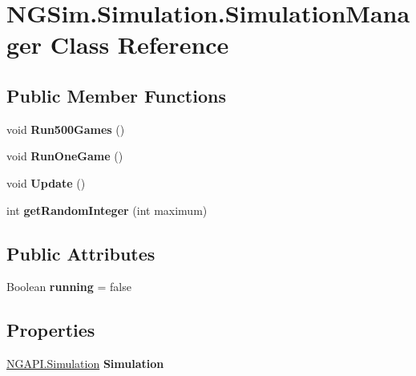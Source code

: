 \hypertarget{class_n_g_sim_1_1_simulation_1_1_simulation_manager}{}\section{N\+G\+Sim.\+Simulation.\+Simulation\+Manager Class Reference}
\label{class_n_g_sim_1_1_simulation_1_1_simulation_manager}
\subsection*{Public Member Functions}
\begin{DoxyCompactItemize}
\item 
\mbox{\label{class_n_g_sim_1_1_simulation_1_1_simulation_manager_afbd05d5e2c71d6c78a1a05cd77a2b246}} 
void {\bfseries Run500\+Games} ()
\item 
\mbox{\label{class_n_g_sim_1_1_simulation_1_1_simulation_manager_af5365991d5e5c33560a7059349e9df00}} 
void {\bfseries Run\+One\+Game} ()
\item 
\mbox{\label{class_n_g_sim_1_1_simulation_1_1_simulation_manager_a0d06f65c2f9db77f976fd15d2b10c96c}} 
void {\bfseries Update} ()
\item 
\mbox{\label{class_n_g_sim_1_1_simulation_1_1_simulation_manager_a3776b01cabeadc19c432985a422eca26}} 
int {\bfseries get\+Random\+Integer} (int maximum)
\end{DoxyCompactItemize}
\subsection*{Public Attributes}
\begin{DoxyCompactItemize}
\item 
\mbox{\label{class_n_g_sim_1_1_simulation_1_1_simulation_manager_acea197295a218c5bbc65b363dd9bd99c}} 
Boolean {\bfseries running} = false
\end{DoxyCompactItemize}
\subsection*{Properties}
\begin{DoxyCompactItemize}
\item 
\mbox{\label{class_n_g_sim_1_1_simulation_1_1_simulation_manager_a720158547b3ebb4a738458c13f3c3dd1}} 
\hyperlink{class_n_g_a_p_i_1_1_simulation}{N\+G\+A\+P\+I.\+Simulation} {\bfseries Simulation}
\end{DoxyCompactItemize}
